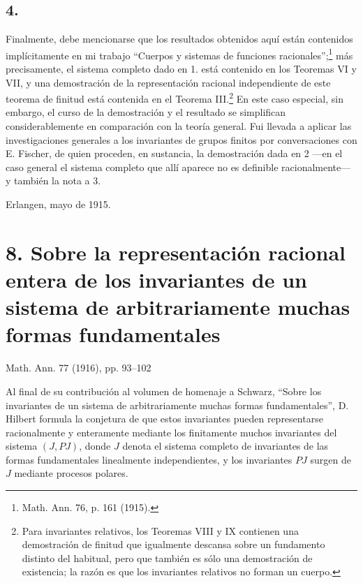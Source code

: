 \documentclass[11pt]{article}
\begin{document}
\subsection*{4.}
Finalmente, debe mencionarse que los resultados obtenidos aquí están contenidos implícitamente en mi trabajo ``Cuerpos y sistemas de funciones racionales'';\footnote{Math. Ann. 76, p. 161 (1915).} más precisamente, el sistema completo dado en 1. está contenido en los Teoremas VI y VII, y una demostración de la representación racional independiente de este teorema de finitud está contenida en el Teorema III.\footnote{Para invariantes relativos, los Teoremas VIII y IX contienen una demostración de finitud que igualmente descansa sobre un fundamento distinto del habitual, pero que también es sólo una demostración de existencia; la razón es que los invariantes relativos no forman un cuerpo.} En este caso especial, sin embargo, el curso de la demostración y el resultado se simplifican considerablemente en comparación con la teoría general. Fui llevada a aplicar las investigaciones generales a los invariantes de grupos finitos por conversaciones con E. Fischer, de quien proceden, en sustancia, la demostración dada en 2 ---en el caso general el sistema completo que allí aparece no es definible racionalmente--- y también la nota a 3.

Erlangen, mayo de 1915.

\clearpage
\section*{8. Sobre la representación racional entera de los invariantes de un sistema de arbitrariamente muchas formas fundamentales}
\begin{center}
Math. Ann. 77 (1916), pp. 93--102
\end{center}

Al final de su contribución al volumen de homenaje a Schwarz, ``Sobre los invariantes de un sistema de arbitrariamente muchas formas fundamentales'', D. Hilbert formula la conjetura de que estos invariantes pueden representarse racionalmente y enteramente mediante los finitamente muchos invariantes del sistema $(J,PJ)$, donde $J$ denota el sistema completo de invariantes de las formas fundamentales linealmente independientes, y los invariantes $PJ$ surgen de $J$ mediante procesos polares.
\end{document}
